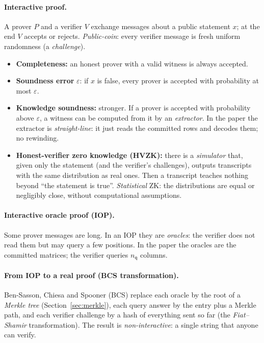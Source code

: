 \documentclass[11pt,a4paper]{article}
\newcommand{\nq}{n_{\mathsf{q}}}
\theoremstyle{definition}
\theoremstyle{plain}
\begin{document}
\paragraph{Interactive proof.} A prover $P$ and a verifier $V$ exchange messages about a public
statement $x$; at the end $V$ accepts or rejects. \emph{Public-coin}: every verifier message is fresh
uniform randomness (a \emph{challenge}).
\begin{itemize}[leftmargin=1.3em]
\item \textbf{Completeness:} an honest prover with a valid witness is always accepted.
\item \textbf{Soundness error} $\varepsilon$: if $x$ is false, every prover is accepted with probability
  at most $\varepsilon$.
\item \textbf{Knowledge soundness:} stronger. If a prover is accepted with probability above
  $\varepsilon$, a witness can be computed from it by an \emph{extractor}. In the paper the extractor is
  \emph{straight-line}: it just reads the committed rows and decodes them; no rewinding.
\item \textbf{Honest-verifier zero knowledge (HVZK):} there is a \emph{simulator} that, given only the
  statement (and the verifier's challenges), outputs transcripts with the same distribution as real
  ones. Then a transcript teaches nothing beyond ``the statement is true''. \emph{Statistical} ZK:
  the distributions are equal or negligibly close, without computational assumptions.
\end{itemize}

\paragraph{Interactive oracle proof (IOP).} Some prover messages are long. In an IOP they are
\emph{oracles}: the verifier does not read them but may query a few positions. In the paper the
oracles are the committed matrices; the verifier queries $\nq$ columns.

\paragraph{From IOP to a real proof (BCS transformation).} Ben-Sasson, Chiesa and Spooner (BCS)
replace each oracle by the root of a \emph{Merkle tree} (Section~\ref{sec:merkle}), each query answer
by the entry plus a Merkle path, and each verifier challenge by a hash of everything sent so far
(the \emph{Fiat--Shamir} transformation). The result is \emph{non-interactive}: a single string that
anyone can verify.
\end{document}
